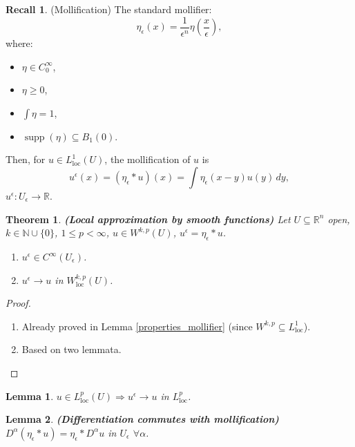 \documentclass[12pt]{article}
\DeclareMathOperator{\supp}{supp}
\newtheorem{lemma}{Lemma}[section]
\newtheorem{theorem}{Theorem}[section]
\theoremstyle{definition}
\newtheorem*{recall}{Recall}
\begin{document}
\begin{recall}
(Mollification) The standard mollifier:
\[\eta_{\epsilon}(x)=\frac{1}{\epsilon^n}\eta\left(\frac{x}{\epsilon}\right),\]
where:
\begin{itemize}
\item $\eta\in C_0^{\infty}$,
\item $\eta\geq0$,
\item $\int\eta=1$,
\item $\supp(\eta)\subseteq B_1(0)$.
\end{itemize}

Then, for $u\in L_{\text{loc}}^1(U)$, the mollification of $u$ is
\[u^{\epsilon}(x)=(\eta_{\epsilon}*u)(x)=\int\eta_{\epsilon}(x-y)u(y)\,dy,\]
$u^{\epsilon}:U_{\epsilon}\rightarrow\mathbb{R}$.
\end{recall}

\begin{theorem}\label{local_approx_smooth}
\emph{\textbf{(Local approximation by smooth functions)}} Let $U\subseteq\mathbb{R}^n$ open, $k\in\mathbb{N}\cup\{0\}$, $1\leq p<\infty$, $u\in W^{k,p}(U)$, $u^{\epsilon}=\eta_{\epsilon}*u$.

\begin{enumerate}[label=(\roman*)]
\item $u^{\epsilon}\in C^{\infty}(U_{\epsilon})$.

\item\label{conv_Sobolev_loc} $u^{\epsilon}\rightarrow u$ in $W_{\text{loc}}^{k,p}(U)$.
\end{enumerate}
\end{theorem}

\begin{proof}
\begin{enumerate}[label=(\roman*)]
\item Already proved in Lemma \ref{properties_mollifier} (since $W^{k,p}\subseteq L_{\text{loc}}^1$).

\item Based on two lemmata.
\end{enumerate}
\end{proof}

\begin{lemma}\label{conv_moll_loc}
$u\in L_{\text{loc}}^p(U)\Rightarrow u^{\epsilon}\rightarrow u$ in $L_{\text{loc}}^p$.
\end{lemma}

\begin{lemma}\label{diff_comm_moll}
\emph{\textbf{(Differentiation commutes with mollification)}} $D^{\alpha}(\eta_{\epsilon}*u)=\eta_{\epsilon}*D^{\alpha}u$ in $U_{\epsilon}$ $\forall\alpha$.
\end{lemma}
\end{document}
